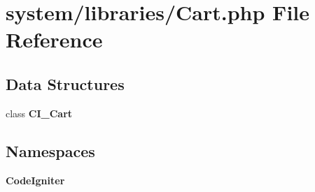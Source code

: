 \section{system/libraries/\-Cart.php File Reference}
\label{_cart_8php}
\subsection*{Data Structures}
\begin{DoxyCompactItemize}
\item 
class {\bf C\-I\-\_\-\-Cart}
\end{DoxyCompactItemize}
\subsection*{Namespaces}
\begin{DoxyCompactItemize}
\item 
{\bf Code\-Igniter}
\end{DoxyCompactItemize}
